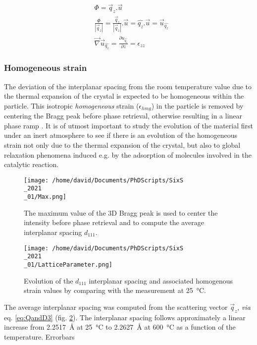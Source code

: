 \begin{align}
    \label{eq:StrainFromPhase1}
    & \Phi =  \vec{q}_z.\vec{u} \\
    \label{eq:StrainFromPhase2}
    & \frac{\Phi}{|\vec{q}_z|} = \frac{\vec{q}_z}{|\vec{q}_z|}.\vec{u} = \hat{q_z}.\vec{u} = \vec{u}_{\hat{q_z}} \\
    \label{eq:StrainFromPhase3}
    & \vec{\nabla} \vec{u}_{\hat{q_z}} = \frac{\partial u_{\hat{q_z}}}{\partial z} = \epsilon_{zz}
\end{align}

\subsubsection{Homogeneous strain}

The deviation of the interplanar spacing from the room temperature value due to the thermal expansion of the crystal is expected to be homogeneous within the particle.
This isotropic \textit{homogeneous} strain ($\epsilon_{hmg}$) in the particle is removed by centering the Bragg peak before phase retrieval, otherwise resulting in a linear phase ramp \parencite{}.
It is of utmost important to study the evolution of the material first under an inert atmosphere to see if there is an evolution of the homogeneous strain not only due to the thermal expansion of the crystal, but also to global relaxation phenomena induced e.g. by the adsorption of molecules involved in the catalytic reaction.

\begin{figure}[!htb]
    \centering
    \texttt{[image: /home/david/Documents/PhDScripts/SixS\\\_2021\\\_01/Max.png]}
    \caption{
        The maximum value of the 3D Bragg peak is used to center the intensity before phase retrieval and to compute the average interplanar spacing $d_{111}$.
    }
    \label{fig:MaxPeak}
\end{figure}

\begin{figure}[!htb]
    \centering
    \texttt{[image: /home/david/Documents/PhDScripts/SixS\\\_2021\\\_01/LatticeParameter.png]}
    \caption{
        Evolution of the $d_{111}$ interplanar spacing and associated homogenous strain values by comparing with the measurement at \qty{25}{\degreeCelsius}.
    }
    \label{fig:HomoStrain}
\end{figure}

The average interplanar spacing was computed from the scattering vector $\vec{q}_z$, \textit{via} eq. \ref{eq:QandD3} (fig. \ref{fig:HomoStrain}).
The interplanar spacing follows approximately a linear increase from \qty{2.2517}{\angstrom} at \qty{25}{\degreeCelsius} to \qty{2.2627}{\angstrom} at \qty{600}{\degreeCelsius} as a function of the temperature.
\textcolor{Important}{Errorbars}

